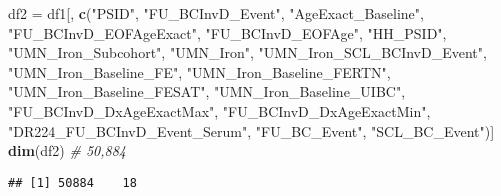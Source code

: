 \documentclass[
]{article}
\newenvironment{Shaded}{\begin{snugshade}}{\end{snugshade}}
\newcommand{\CommentTok}[1]{\textcolor[rgb]{0.56,0.35,0.01}{\textit{#1}}}
\newcommand{\KeywordTok}[1]{\textcolor[rgb]{0.13,0.29,0.53}{\textbf{#1}}}
\newcommand{\NormalTok}[1]{#1}
\newcommand{\StringTok}[1]{\textcolor[rgb]{0.31,0.60,0.02}{#1}}
\begin{document}
\begin{Shaded}
\begin{Highlighting}[]
\NormalTok{df2 =}\StringTok{ }\NormalTok{df1[, }\KeywordTok{c}\NormalTok{(}\StringTok{"PSID"}\NormalTok{, }\StringTok{"FU_BCInvD_Event"}\NormalTok{, }\StringTok{"AgeExact_Baseline"}\NormalTok{, }\StringTok{"FU_BCInvD_EOFAgeExact"}\NormalTok{, }
    \StringTok{"FU_BCInvD_EOFAge"}\NormalTok{, }\StringTok{"HH_PSID"}\NormalTok{, }\StringTok{"UMN_Iron_Subcohort"}\NormalTok{, }\StringTok{"UMN_Iron"}\NormalTok{, }\StringTok{"UMN_Iron_SCL_BCInvD_Event"}\NormalTok{, }
    \StringTok{"UMN_Iron_Baseline_FE"}\NormalTok{, }\StringTok{"UMN_Iron_Baseline_FERTN"}\NormalTok{, }\StringTok{"UMN_Iron_Baseline_FESAT"}\NormalTok{, }
    \StringTok{"UMN_Iron_Baseline_UIBC"}\NormalTok{, }\StringTok{"FU_BCInvD_DxAgeExactMax"}\NormalTok{, }\StringTok{"FU_BCInvD_DxAgeExactMin"}\NormalTok{, }
    \StringTok{"DR224_FU_BCInvD_Event_Serum"}\NormalTok{, }\StringTok{"FU_BC_Event"}\NormalTok{, }\StringTok{"SCL_BC_Event"}\NormalTok{)]}
\KeywordTok{dim}\NormalTok{(df2)  }\CommentTok{# 50,884}
\end{Highlighting}
\end{Shaded}

\begin{verbatim}
## [1] 50884    18
\end{verbatim}
\end{document}
